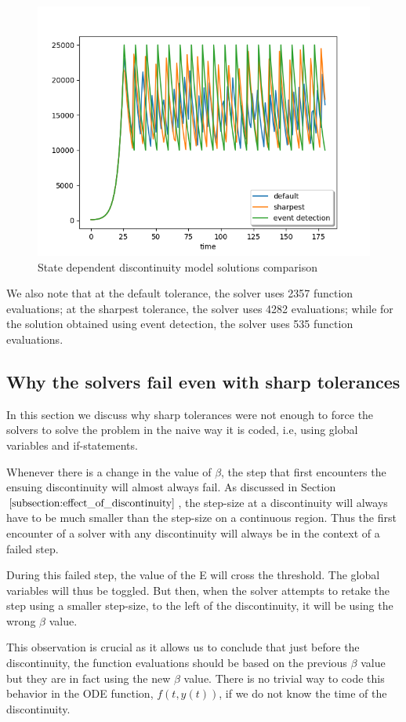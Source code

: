 \begin{figure}[H]
\centering
\includegraphics[width=0.7\linewidth]{./figures/comparison_state_default_sharp_event}
\caption{State dependent discontinuity model solutions comparison}
\label{fig:comparison_state_default_sharp_event}
\end{figure}

We also note that at the default tolerance, the solver uses 2357 function evaluations; at the sharpest tolerance, the solver uses 4282 evaluations; while for the solution obtained using event detection, the solver uses 535 function evaluations.

\subsection{Why the solvers fail even with sharp tolerances}
\label{subsection:state_sharp_tol_failed}
In this section we discuss why sharp tolerances were not enough to force the solvers to solve the problem in the naive way it is coded, i.e, using global variables and if-statements. 

Whenever there is a change in the value of $\beta$, the step that first encounters the ensuing discontinuity will almost always fail. As discussed in Section $\ref{subsection:effect_of_discontinuity}$, the step-size at a discontinuity will always have to be much smaller than the step-size on a continuous region. Thus the first encounter of a solver with any discontinuity will always be in the context of a failed step.

During this failed step, the value of the E will cross the threshold. The global variables will thus be toggled. But then, when the solver attempts to retake the step using a smaller step-size, to the left of the discontinuity, it will be using the wrong $\beta$ value. 

This observation is crucial as it allows us to conclude that just before the discontinuity, the function evaluations should be based on the previous $\beta$ value but they are in fact using the new $\beta$ value. There is no trivial way to code this behavior in the ODE function, $f(t, y(t))$, if we do not know the time of the discontinuity. 

